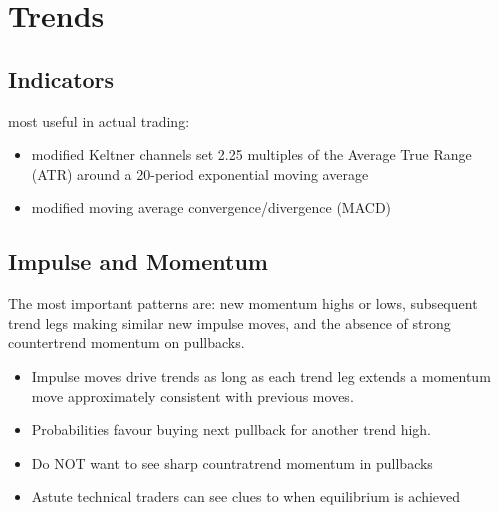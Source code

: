 \documentclass{../notes}
\begin{document}
\section{Trends}
\subsection{Indicators}
most useful in actual trading:
\begin{itemize}
  \item modified Keltner channels set 2.25 multiples of the Average True Range (ATR) around a 20-period exponential moving average
  \item modified moving average convergence/divergence (MACD)
\end{itemize}
\subsection{Impulse and Momentum}
The most important patterns are: new momentum highs or lows, subsequent trend legs making similar new impulse moves, and the absence of strong countertrend momentum on pullbacks.
\begin{itemize}
  \item Impulse moves drive trends as long as each trend leg extends a momentum move approximately consistent with previous moves.
  \item Probabilities favour buying next pullback for another trend high.
  \item Do NOT want to see sharp countratrend momentum in pullbacks
  \item Astute technical traders can see clues to when equilibrium is achieved
\end{itemize}
\end{document}
